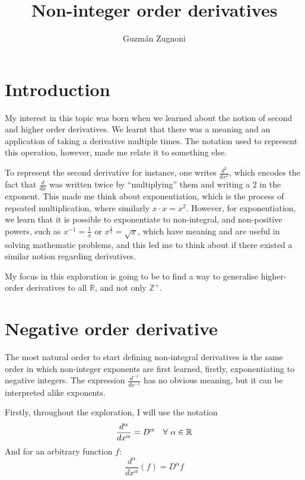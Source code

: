 \documentclass{article}
\author{Guzmán Zugnoni}
\title{Non-integer order derivatives}
\renewcommand{\maketitle}{
\begin{center}
	\Huge\textbf \thetitle
\end{center}
}
\def\squad{\hskip2\fontdimen3\font}
\begin{document}
\maketitle

\newpage

\tableofcontents

\newpage

\section{Introduction}

My interest in this topic was born when we learned about the notion of second
and higher order derivatives. We learnt that there was a meaning and an
application of taking a derivative multiple times. The notation used to
represent this operation, however, made me relate it to something else.

To represent the second derivative for instance, one writes $\frac{d^2}{dx^2}$,
which encodes the fact that $\frac{d}{dx}$ was written twice by ``multiplying''
them and writing a $2$ in the exponent. This made me think about
exponentiation, which is the process of repeated multiplication, where
similarly $x \cdot x = x^2$. However, for exponentiation, we learn that it is
possible to exponentiate to non-integral, and non-positive powers, such as
$x^{-1}=\frac{1}{x}$ or $x^\frac{1}{2} = \sqrt{x}$, which have meaning and are
useful in solving mathematic problems, and this led me to think about if there
existed a similar notion regarding derivatives.

My focus in this exploration is going to be to find a way to generalise
higher-order derivatives to all $\mathbb{R}$, and not only $\mathbb{Z}^{+}$.

\section{Negative order derivative}

The most natural order to start defining non-integral derivatives is the same
order in which non-integer exponents are first learned,
firstly, exponentiating to negative integers. The expression
$\frac{d^{-1}}{dx^{-1}}$ has no obvious meaning, but it can be interpreted
alike exponents.

Firstly, throughout the exploration, I will use the notation
$$\frac{d^\alpha}{dx^\alpha}=D^\alpha \quad \forall \squad \alpha \in
\mathbb{R}$$
And for an arbitrary function $f$:
$$\frac{d^\alpha}{dx^\alpha}\left(f\right) = D^\alpha f$$
\end{document}

